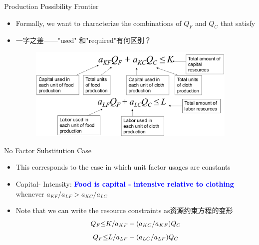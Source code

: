 \documentclass[10pt,hyperref={CJKbookmarks=true},xcolor=dvipsnames,aspectratio=169]{beamer}
\begin{document}
\begin{frame}{Production Possibility Frontier }

\begin{itemize}
\item Formally, we want to characterize the combinations of $Q_{F}$ and
$Q_{C}$ that satisfy 
\item 一字之差——"used" 和"required"有何区别？
\begin{figure}


\includegraphics[width=10cm]{fig/ho/lec5-5}

\end{figure}

\end{itemize}
\end{frame}

\begin{frame}{No Factor Substitution Case }

\begin{itemize}
\item This corresponds to the case in which unit factor usages are constants 
\item Capital- Intensity: \textbf{\textcolor{blue}{Food is capital - intensive
relative to clothing}} whenever $a_{KF}/a_{LF}>a_{KC}/a_{LC}$ 
\item Note that we can write the resource constraints as资源约束方程的变形 
\[
Q_{F}\text{\ensuremath{\le}}K/a_{KF}-(a_{KC}/a_{KF})Q_{C}
\]
\[
Q_{F}\text{\ensuremath{\le}}L/a_{LF}-(a_{LC}/a_{LF})Q_{C}
\]

\end{itemize}
\end{frame}
\end{document}
